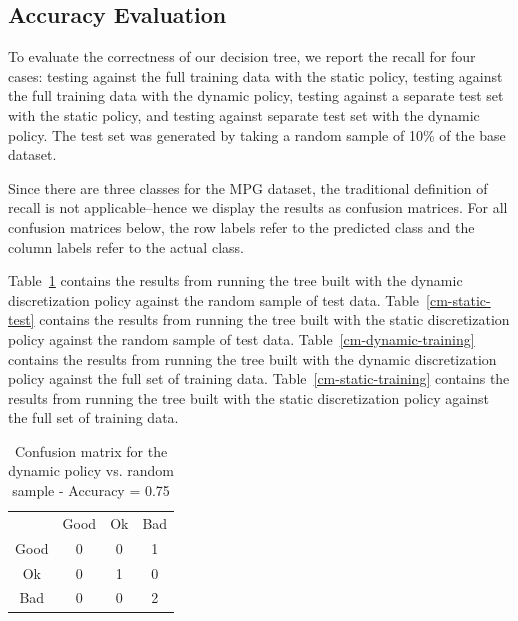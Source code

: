 \documentclass[12pt, conference, compsocconf]{IEEEtran}
\begin{document}
\subsection{Accuracy Evaluation}
To evaluate the correctness of our decision tree, we report the recall for four cases: testing against the full training data with the static policy, testing against the full training data with the dynamic policy, testing against a separate test set with the static policy, and testing against separate test set with the dynamic policy. 
The test set was generated by taking a random sample of 10\% of the base dataset. 

Since there are three classes for the MPG dataset, the traditional definition of recall is not applicable--hence we display the results as confusion matrices. 
For all confusion matrices below, the row labels refer to the predicted class and the column labels refer to the actual class.

Table~\ref{cm-dynamic-test} contains the results from running the tree built with the dynamic discretization policy against the random sample of test data. 
Table~\ref{cm-static-test} contains the results from running the tree built with the static discretization policy against the random sample of test data. 
Table~\ref{cm-dynamic-training} contains the results from running the tree built with the dynamic discretization policy against the full set of training data. 
Table~\ref{cm-static-training} contains the results from running the tree built with the static discretization policy against the full set of training data. 

\begin{table}[h!]
\centering
\begin{tabular}{cccc}
                          & Good                   & Ok                     & Bad                    \\ \cline{2-4} 
\multicolumn{1}{c|}{Good} & \multicolumn{1}{c|}{0} & \multicolumn{1}{c|}{0} & \multicolumn{1}{c|}{1} \\ \cline{2-4} 
\multicolumn{1}{c|}{Ok}   & \multicolumn{1}{c|}{0} & \multicolumn{1}{c|}{1} & \multicolumn{1}{c|}{0} \\ \cline{2-4} 
\multicolumn{1}{c|}{Bad}  & \multicolumn{1}{c|}{0} & \multicolumn{1}{c|}{0} & \multicolumn{1}{c|}{2} \\ \cline{2-4} 
\end{tabular}
\caption{Confusion matrix for the dynamic policy vs. random sample - Accuracy = 0.75}
\label{cm-dynamic-test}
\end{table}
\end{document}
